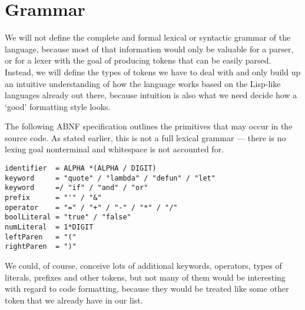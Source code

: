 \section{Grammar}
We will not define the complete and formal lexical or syntactic grammar of the language,
because most of that information would only be valuable for a parser,
or for a lexer with the goal of producing tokens that can be easily parsed.
Instead, we will define the types of tokens we have to deal with
and only build up an intuitive understanding of how the language works
based on the Lisp-like languages already out there,
because intuition is also what we need decide how a `good' formatting style looks.

The following ABNF specification outlines the primitives that may occur in the source code.
As stated earlier, this is not a full lexical grammar ---
there is no lexing goal nonterminal and whitespace is not accounted for.

\begin{verbatim}
identifier  = ALPHA *(ALPHA / DIGIT)
keyword     = "quote" / "lambda" / "defun" / "let"
keyword     =/ "if" / "and" / "or"
prefix      = "'" / "&"
operator    = "=" / "+" / "-" / "*" / "/"
boolLiteral = "true" / "false"
numLiteral  = 1*DIGIT
leftParen   = "("
rightParen  = ")"
\end{verbatim}

We could, of course, conceive lots of additional keywords, operators,
types of literals, prefixes and other tokens,
but not many of them would be interesting with regard to code formatting,
because they would be treated like some other token that we already have in our list.
